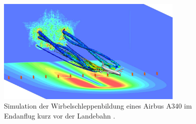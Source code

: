 \begin{figure}
\centering
\includegraphics[width=0.8\textwidth]{papers/wirbelringe/fig/wirbelschleppen_in_der_simulation.jpg}
\caption{Simulation der Wirbelschleppenbildung eines Airbus A340 im Endanflug kurz vor der Landebahn
%
%
\cite{Wirbelringe:wirbelschleppen_in_der_simulation}. \label{Wirbelringe:fig:wirbelschleppen_in_der_simulation}}
\end{figure}
